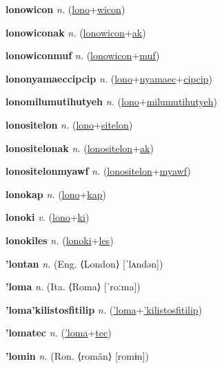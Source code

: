 \textbf{\hypertarget{lonowicon}{lonowicon}} \textit{n.} (\hyperlink{lono}{lono}+\allowbreak \hyperlink{wicon}{wicon})


\textbf{\hypertarget{lonowiconak}{lonowiconak}} \textit{n.} (\hyperlink{lonowicon}{lonowicon}+\allowbreak \hyperlink{ak}{ak})


\textbf{\hypertarget{lonowiconmuf}{lonowiconmuf}} \textit{n.} (\hyperlink{lonowicon}{lonowicon}+\allowbreak \hyperlink{muf}{muf})


\textbf{\hypertarget{lononyamaeccipcip}{lononyamaeccipcip}} \textit{n.} (\hyperlink{lono}{lono}+\allowbreak \hyperlink{nyamaec}{nyamaec}+\allowbreak \hyperlink{cipcip}{cipcip})


\textbf{\hypertarget{lonomilumutihutyeh}{lonomilumutihutyeh}} \textit{n.} (\hyperlink{lono}{lono}+\allowbreak \hyperlink{milumutihutyeh}{milumutihutyeh})


\textbf{\hypertarget{lonositelon}{lonositelon}} \textit{n.} (\hyperlink{lono}{lono}+\allowbreak \hyperlink{sitelon}{sitelon})


\textbf{\hypertarget{lonositelonak}{lonositelonak}} \textit{n.} (\hyperlink{lonositelon}{lonositelon}+\allowbreak \hyperlink{ak}{ak})


\textbf{\hypertarget{lonositelonmyawf}{lonositelonmyawf}} \textit{n.} (\hyperlink{lonositelon}{lonositelon}+\allowbreak \hyperlink{myawf}{myawf})


\textbf{\hypertarget{lonokap}{lonokap}} \textit{n.} (\hyperlink{lono}{lono}+\allowbreak \hyperlink{kap}{kap})


\textbf{\hypertarget{lonoki}{lonoki}} \textit{v.} (\hyperlink{lono}{lono}+\allowbreak \hyperlink{ki}{ki})


\textbf{\hypertarget{lonokiles}{lonokiles}} \textit{n.} (\hyperlink{lonoki}{lonoki}+\allowbreak \hyperlink{les}{les})


\textbf{\hypertarget{'lontan}{'lontan}} \textit{n.} (Eng. ⟨London⟩ [ˈlʌndən])


\textbf{\hypertarget{'loma}{'loma}} \textit{n.} (Ita. ⟨Roma⟩ [ˈroːma])


\textbf{\hypertarget{'loma'kilistosfitilip}{'loma'kilistosfitilip}} \textit{n.} (\hyperlink{'loma}{'loma}+\allowbreak \hyperlink{'kilistosfitilip}{'kilistosfitilip})


\textbf{\hypertarget{'lomatec}{'lomatec}} \textit{n.} (\hyperlink{'loma}{'loma}+\allowbreak \hyperlink{tec}{tec})


\textbf{\hypertarget{'lomin}{'lomin}} \textit{n.} (Ron. ⟨român⟩ [romɨn])


